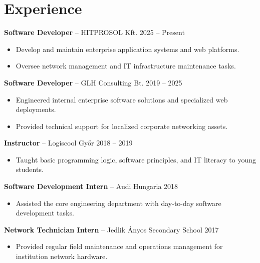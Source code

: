 \documentclass[11pt,a4paper]{article}
\begin{document}
\section{Experience}

\textbf{Software Developer} -- HITPROSOL Kft. \hfill 2025 -- Present
\begin{itemize}[noitemsep,topsep=2pt,leftmargin=0.15in]
    \item Develop and maintain enterprise application systems and web platforms.
    \item Oversee network management and IT infrastructure maintenance tasks.
\end{itemize}

\vspace{4pt}
\textbf{Software Developer} -- GLH Consulting Bt. \hfill 2019 -- 2025
\begin{itemize}[noitemsep,topsep=2pt,leftmargin=0.15in]
    \item Engineered internal enterprise software solutions and specialized web deployments.
    \item Provided technical support for localized corporate networking assets.
\end{itemize}

\vspace{4pt}
\textbf{Instructor} -- Logiscool Győr \hfill 2018 -- 2019
\begin{itemize}[noitemsep,topsep=2pt,leftmargin=0.15in]
    \item Taught basic programming logic, software principles, and IT literacy to young students.
\end{itemize}

\vspace{4pt}
\textbf{Software Development Intern} -- Audi Hungaria \hfill 2018
\begin{itemize}[noitemsep,topsep=2pt,leftmargin=0.15in]
    \item Assisted the core engineering department with day-to-day software development tasks.
\end{itemize}

\vspace{4pt}
\textbf{Network Technician Intern} -- Jedlik Ányos Secondary School \hfill 2017
\begin{itemize}[noitemsep,topsep=2pt,leftmargin=0.15in]
    \item Provided regular field maintenance and operations management for institution network hardware.
\end{itemize}
\end{document}
